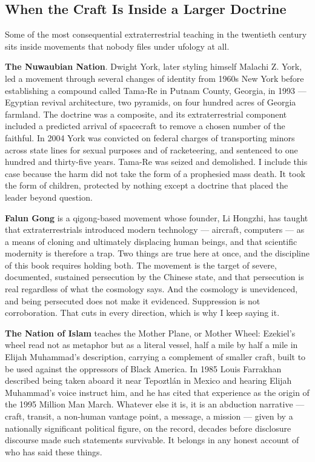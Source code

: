 \subsection{When the Craft Is Inside a Larger Doctrine}\label{sec:cultdoctrines}

Some of the most consequential extraterrestrial teaching in the twentieth century sits inside
movements that nobody files under ufology at all.

\textbf{The Nuwaubian Nation}. Dwight York, later styling himself Malachi Z. York, led a movement
through several changes of identity from 1960s New York before establishing a compound called
Tama-Re in Putnam County, Georgia, in 1993 --- Egyptian revival architecture, two pyramids, on
four hundred acres of Georgia farmland. The doctrine was a composite, and its extraterrestrial
component included a predicted arrival of spacecraft to remove a chosen number of the faithful.
In 2004 York was convicted on federal charges of transporting minors across state lines for
sexual purposes and of racketeering, and sentenced to one hundred and thirty-five years. Tama-Re
was seized and demolished. I include this case because the harm did not take the form of a
prophesied mass death. It took the form of children, protected by nothing except a doctrine that
placed the leader beyond question.

\textbf{Falun Gong} is a qigong-based movement whose founder, Li Hongzhi, has taught that
extraterrestrials introduced modern technology --- aircraft, computers --- as a means of cloning
and ultimately displacing human beings, and that scientific modernity is therefore a trap. Two
things are true here at once, and the discipline of this book requires holding both. The movement
is the target of severe, documented, sustained persecution by the Chinese state, and that
persecution is real regardless of what the cosmology says. And the cosmology is unevidenced,
and being persecuted does not make it evidenced. Suppression is not corroboration. That cuts in
every direction, which is why I keep saying it.

\textbf{The Nation of Islam} teaches the Mother Plane, or Mother Wheel: Ezekiel's wheel read not
as metaphor but as a literal vessel, half a mile by half a mile in Elijah Muhammad's description,
carrying a complement of smaller craft, built to be used against the oppressors of Black America.
In 1985 Louis Farrakhan described being taken aboard it near Tepoztl\'an in Mexico and hearing
Elijah Muhammad's voice instruct him, and he has cited that experience as the origin of the 1995
Million Man March. Whatever else it is, it is an abduction narrative --- craft, transit, a
non-human vantage point, a message, a mission --- given by a nationally significant political
figure, on the record, decades before disclosure discourse made such statements survivable. It
belongs in any honest account of who has said these things.

